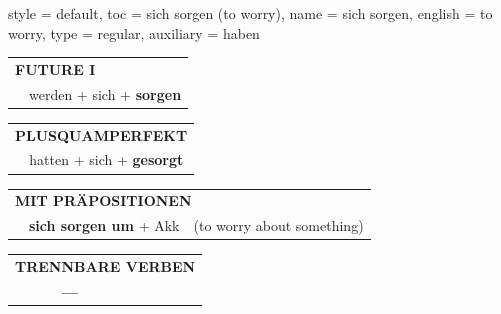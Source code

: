 \begin{verbentry}{
  style = {default},
  toc = {sich sorgen (to worry)},
  name = {sich sorgen},
  english = {to worry},
  type = {regular},
  auxiliary = {haben}
}
\begin{tabular}{rl}
    \multicolumn{2}{l}{\textbf{FUTURE I} }\\
    &werden + sich + \textbf{sorgen}\\
 
  \end{tabular}
\hfill
   \begin{tabular}{rl}
      \multicolumn{2}{l}{\textbf{PLUSQUAMPERFEKT}}\\
    &hatten + sich + \textbf{gesorgt}\\
  \end{tabular}
  
\vspace{10pt}

   \begin{tabular}{lll}
      \multicolumn{3}{l}{\textbf{MIT PRÄPOSITIONEN}}\\
& \textbf{sich sorgen um} + Akk & (to worry about something)
  \end{tabular}
  \hfill
   \begin{tabular}{lll}
\multicolumn{3}{l}{\textbf{TRENNBARE VERBEN}}\\
& \textbf{---} & \\
\end{tabular}
  
  \vspace{-5pt}
\end{verbentry}

